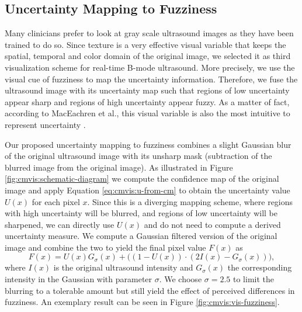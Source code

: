 \subsection{Uncertainty Mapping to Fuzziness}

Many clinicians prefer to look at gray scale ultrasound images as they have been trained to do so.
Since texture is a very effective visual variable that keeps the spatial, temporal and color domain of the original image, we selected it as third visualization scheme for real-time B-mode ultrasound.
More precisely, we use the visual cue of fuzziness to map the uncertainty information.
Therefore, we fuse the ultrasound image with its uncertainty map such that regions of low uncertainty appear sharp and regions of high uncertainty appear fuzzy.
As a matter of fact, according to MacEachren et al., this visual variable is also the most intuitive to represent uncertainty \cite{MacEachren:2012:VisualSemiotics}.

Our proposed uncertainty mapping to fuzziness combines a slight Gaussian blur of the original ultrasound image with its unsharp mask (subtraction of the blurred image from the original image).
As illustrated in Figure \ref{fig:cmvis:schematic-diagram} we compute the confidence map of the original image and apply Equation \ref{eq:cmvis:u-from-cm} to obtain the uncertainty value $U(x)$ for each pixel $x$.
Since this is a diverging mapping scheme, where regions with high uncertainty will be blurred, and regions of low uncertainty will be sharpened, we can directly use $U(x)$ and do not need to compute a derived uncertainty measure.
We compute a Gaussian filtered version of the original image and combine the two to yield the final pixel value $F(x)$ as
\begin{equation}
	F(x) = U(x) G_\sigma(x) + \big( (1-U(x)) \cdot (2I(x) - G_\sigma(x)) \big),
\end{equation}
where $I(x)$ is the original ultrasound intensity and $G_\sigma(x)$ the corresponding intensity in the Gaussian with parameter $\sigma$.
We choose $\sigma = 2.5$ to limit the blurring to a tolerable amount but still yield the effect of perceived differences in fuzziness.
An exemplary result can be seen in Figure \ref{fig:cmvis:vis-fuzziness}.

